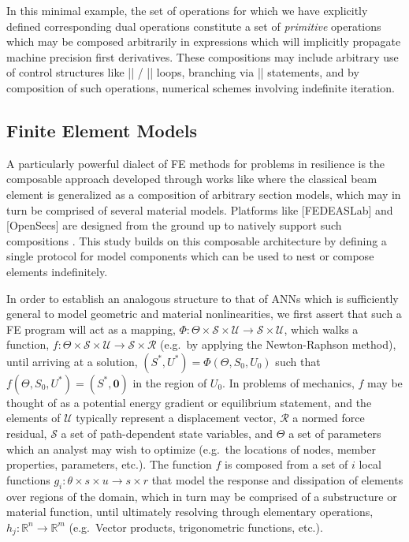 In this minimal example, the set of operations for which we have
explicitly defined corresponding dual operations constitute a set of
\emph{primitive} operations which may be composed arbitrarily in
expressions which will implicitly propagate machine precision first
derivatives. These compositions may include arbitrary use of control
structures like \VERB|| /
\VERB|| loops, branching via
\VERB|| statements, and by composition of such
operations, numerical schemes involving indefinite iteration.



\hypertarget{part-ii-the-finite-element-method}{%
\subsection{Finite Element Models}\label{part-ii-the-finite-element-method}}



A particularly powerful dialect of FE methods for problems in resilience
is the composable approach developed through works like
\textcite{spacone1996fibre} where the classical beam element is
generalized as a composition of arbitrary section models, which may in
turn be comprised of several material models. Platforms like
{[}FEDEASLab{]} and {[}OpenSees{]} are designed from the ground up to
natively support such compositions \autocite{mckenna2010nonlinear}. This
study builds on this composable architecture by defining a single
protocol for model components which can be used to nest or compose
elements indefinitely.

In order to establish an analogous structure to that of ANNs which is
sufficiently general to model geometric and material nonlinearities, we
first assert that such a FE program will act as a mapping,
\(\Phi: \Theta\times\mathcal{S}\times\mathcal{U}\rightarrow\mathcal{S}\times\mathcal{U}\),
which walks a function,
\(f: \Theta\times\mathcal{S}\times\mathcal{U}\rightarrow\mathcal{S}\times\mathcal{R}\)
(e.g.~by applying the Newton-Raphson method), until arriving at a
solution, \((S^*,U^*)=\Phi(\Theta,S_0,U_0)\) such that
\(f(\Theta,S_0,U^*) = (S^*, \mathbf{0})\) in the region of \(U_0\). In
problems of mechanics, \(f\) may be thought of as a potential energy
gradient or equilibrium statement, and the elements of \(\mathcal{U}\)
typically represent a displacement vector, \(\mathcal{R}\) a normed
force residual, \(\mathcal{S}\) a set of path-dependent state variables,
and \(\Theta\) a set of parameters which an analyst may wish to optimize
(e.g.~the locations of nodes, member properties, parameters, etc.). The
function \(f\) is composed from a set of \(i\) local functions
\(g_i: \theta\times s\times u \rightarrow s\times r\) that model the
response and dissipation of elements over regions of the domain, which
in turn may be comprised of a substructure or material function, until
ultimately resolving through elementary operations,
\(h_j: \mathbb{R}^n\rightarrow\mathbb{R}^m\) (e.g.~Vector products,
trigonometric functions, etc.).


